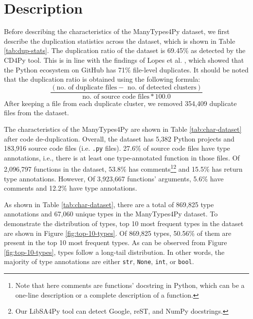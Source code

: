 \documentclass[10pt, conference]{IEEEtran}
\begin{document}
\section{Description}
Before describing the characteristics of the ManyTypes4Py dataset, we first describe the duplication statistics across the dataset, which is shown in Table \ref{tab:dup-stats}. The duplication ratio of the dataset is 69.45\% as detected by the CD4Py tool. This is in line with the findings of Lopes et al. \cite{lopes2017dejavu}, which showed that the Python ecosystem on GitHub has 71\% file-level duplicates. It should be noted that the duplication ratio is obtained using the following formula:
\begin{equation}
\frac{(\text{no. of duplicate files} -\text{ no. of detected clusters})}{\text{no. of source code files} * 100.0}
\end{equation}
After keeping a file from each duplicate cluster, we removed 354,409 duplicate files from the dataset.

The characteristics of the ManyTypes4Py are shown in Table \ref{tab:char-dataset} after code de-duplication. Overall, the dataset has 5,382 Python projects and 183,916 source code files (i.e. \texttt{.py} files). 27.6\% of source code files have type annotations, i.e., there is at least one type-annotated function in those files. Of 2,096,797 functions in the dataset, 53.8\% has comments\footnote{Note that here comments are functions' docstring in Python, which can be a one-line description or a complete description of a function.}\footnote{Our LibSA4Py tool can detect Google, reST, and NumPy docstrings.} and 15.5\% has return type annotations. However, Of 3,923,667 functions' arguments, 5.6\% have comments and 12.2\% have type annotations.

As shown in Table \ref{tab:char-dataset}, there are a total of 869,825 type annotations and 67,060 unique types in the ManyTypes4Py dataset. To demonstrate the distribution of types, top 10 most frequent types in the dataset are shown in Figure \ref{fig:top-10-types}. Of 869,825 types, 50.56\% of them are present in the top 10 most frequent types. As can be observed from Figure \ref{fig:top-10-types}, types follow a long-tail distribution. In other words, the majority of type annotations are either \texttt{str}, \texttt{None}, \texttt{int}, or \texttt{bool}.
\end{document}
